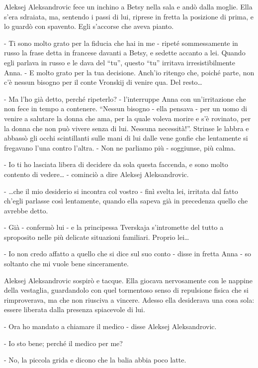 Aleksej Aleksandrovic fece un inchino a Betsy nella sala e andò dalla moglie. Ella s'era sdraiata, ma, sentendo i passi di lui, riprese in fretta la posizione di prima, e lo guardò con spavento. Egli s'accorse che aveva pianto. 

- Ti sono molto grato per la fiducia che hai in me - ripeté sommessamente in russo la frase detta in francese davanti a Betsy, e sedette accanto a lei. Quando egli parlava in russo e le dava del ``tu'', questo ``tu'' irritava irresistibilmente Anna. - E molto grato per la tua decisione. Anch'io ritengo che, poiché parte, non c'è nessun bisogno per il conte Vronskij di venire qua. Del resto\ldots{} 

- Ma l'ho già detto, perché ripeterlo? - l'interruppe Anna con un'irritazione che non fece in tempo a contenere. ``Nessun bisogno - ella pensava - per un uomo di venire a salutare la donna che ama, per la quale voleva morire e s'è rovinato, per la donna che non può vivere senza di lui. Nessuna necessità!''. Strinse le labbra e abbassò gli occhi scintillanti sulle mani di lui dalle vene gonfie che lentamente si fregavano l'una contro l'altra. - Non ne parliamo più - soggiunse, più calma. 

- Io ti ho lasciata libera di decidere da sola questa faccenda, e sono molto contento di vedere\ldots{} - cominciò a dire Aleksej Aleksandrovic. 

- \ldots{}che il mio desiderio si incontra col vostro - finì svelta lei, irritata dal fatto ch'egli parlasse così lentamente, quando ella sapeva già in precedenza quello che avrebbe detto. 

- Già - confermò lui - e la principessa Tverskaja s'intromette del tutto a sproposito nelle più delicate situazioni familiari. Proprio lei\ldots{} 

- Io non credo affatto a quello che si dice sul suo conto - disse in fretta Anna - so soltanto che mi vuole bene sinceramente. 

Aleksej Aleksandrovic sospirò e tacque. Ella giocava nervosamente con le nappine della vestaglia, guardandolo con quel tormentoso senso di repulsione fisica che si rimproverava, ma che non riusciva a vincere. Adesso ella desiderava una cosa sola: essere liberata dalla presenza spiacevole di lui. 

- Ora ho mandato a chiamare il medico - disse Aleksej Aleksandrovic. 

- Io sto bene; perché il medico per me? 

- No, la piccola grida e dicono che la balia abbia poco latte. 

